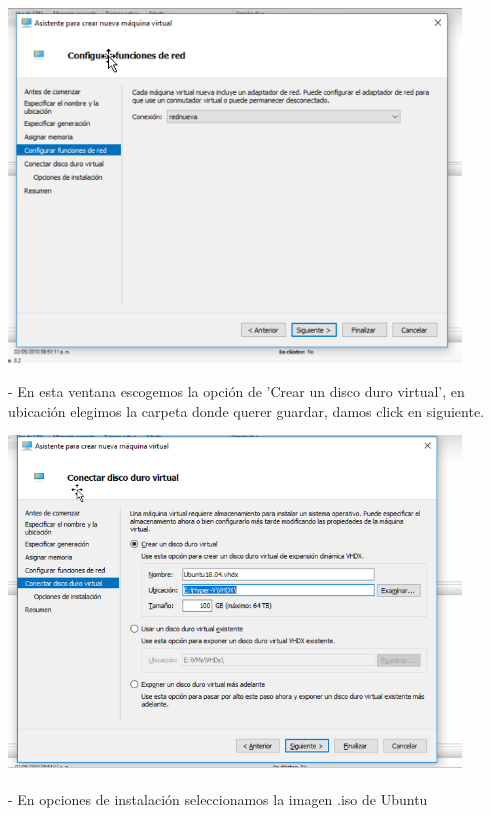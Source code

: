 \documentclass[12pt,letterpaper]{article}
\begin{document}
\begin{center}
	\includegraphics[width=12cm]{./Imagenes/10} 
\end{center}

\begin{itemize}
- En esta ventana escogemos la opción de 'Crear un disco duro virtual', en ubicación elegimos la carpeta donde querer guardar, damos click en siguiente.\\
\end{itemize}

\begin{center}
	\includegraphics[width=12cm]{./Imagenes/11} 
\end{center}


\begin{itemize}
- En opciones de instalación seleccionamos la imagen .iso de Ubuntu\\
\end{itemize}
\end{document}
